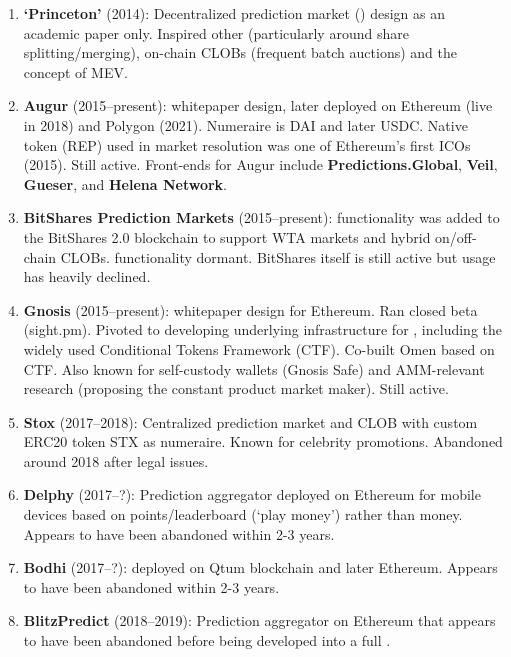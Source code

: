 \begin{enumerate}
\item \textbf{`Princeton' \depm} (2014): Decentralized prediction market (\depm) design as an academic paper only. Inspired other \depms (particularly around share splitting/merging), on-chain CLOBs (frequent batch auctions) and the concept of MEV.  

\item \textbf{Augur} (2015--present): \depm whitepaper design, later deployed on Ethereum (live in 2018) and Polygon (2021). Numeraire is DAI and later USDC. Native token (REP) used in market resolution was one of Ethereum's first ICOs (2015). Still active. Front-ends for Augur include \textbf{Predictions.Global}, \textbf{Veil}, \textbf{Gueser}, and \textbf{Helena Network}.

\item \textbf{BitShares Prediction Markets} (2015--present): \depm functionality was added to the BitShares 2.0 blockchain to support WTA markets and hybrid on/off-chain CLOBs. \depm functionality dormant. BitShares itself is still active but usage has heavily declined.
 
\item \textbf{Gnosis} (2015--present): \depm whitepaper design for Ethereum. Ran closed beta (sight.pm). Pivoted to developing underlying infrastructure for \depms, including the widely used Conditional Tokens Framework (CTF). Co-built Omen based on CTF. Also known for self-custody wallets (Gnosis Safe) and AMM-relevant research (proposing the constant product market maker). Still active. 

\item \textbf{Stox} (2017--2018): Centralized prediction market and CLOB with custom ERC20 token STX as numeraire. Known for celebrity promotions. Abandoned around 2018 after legal issues. 

\item \textbf{Delphy} (2017--?): Prediction aggregator deployed on Ethereum for mobile devices based on points/leaderboard (`play money') rather than money. Appears to have been abandoned within 2-3 years.

\item \textbf{Bodhi} (2017--?): \depm deployed on Qtum blockchain and later Ethereum. Appears to have been abandoned within 2-3 years. 

\item \textbf{BlitzPredict} (2018--2019): Prediction aggregator on Ethereum that appears to have been abandoned before being developed into a full \depm.


\end{enumerate}
